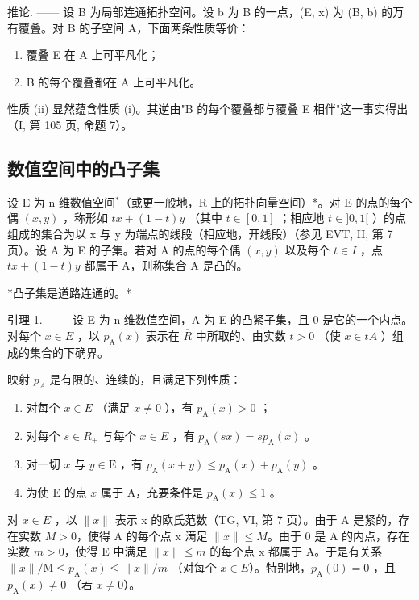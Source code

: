 推论. —— 设 B 为局部连通拓扑空间。设 b 为 B 的一点，(E, x) 为 (B, b) 的万有覆叠。对 B 的子空间 A，下面两条性质等价：

\begin{enumerate}
\def\labelenumi{(\roman{enumi})}
\item
  覆叠 E 在 A 上可平凡化；
\item
  B 的每个覆叠都在 A 上可平凡化。
\end{enumerate}

性质 (ii) 显然蕴含性质 (i)。其逆由"B 的每个覆叠都与覆叠 E 相伴"这一事实得出（I, 第 105 页, 命题 7）。

\subsection{数值空间中的凸子集}

设 E 为 n 维数值空间\(^{*}\)（或更一般地，R 上的拓扑向量空间）*。对 E 的点的每个偶 \((x,y)\) ，称形如 \(tx + (1-t)y\) （其中 \(t \in [0,1]\) ；相应地 \(t \in ]0,1[\) ）的点组成的集合为以 x 与 y 为端点的线段（相应地，开线段）（参见 EVT, II, 第 7 页）。设 A 为 E 的子集。若对 A 的点的每个偶 \((x,y)\) 以及每个 \(t \in I\) ，点 \(tx + (1-t)y\) 都属于 A，则称集合 A 是凸的。

*凸子集是道路连通的。*

引理 1. —— 设 E 为 n 维数值空间，A 为 E 的凸紧子集，且 0 是它的一个内点。对每个 \(x \in E\) ，以 \(p_{\mathrm{A}}(x)\) 表示在 \(\overline{R}\) 中所取的、由实数 \(t > 0\) （使 \(x \in tA\) ）组成的集合的下确界。

映射 \(p_{A}\) 是有限的、连续的，且满足下列性质：

\begin{enumerate}
\def\labelenumi{(\roman{enumi})}
\item
  对每个 \(x \in E\) （满足 \(x \neq 0\) ），有 \(p_{\mathrm{A}}(x) > 0\) ；
\item
  对每个 \(s \in R_{+}\) 与每个 \(x \in E\) ，有 \(p_{\mathrm{A}}(sx) = sp_{\mathrm{A}}(x)\) 。
\item
  对一切 \(x\) 与 \(y \in \mathrm{E}\) ，有 \(p_{\mathrm{A}}(x + y) \leqslant p_{\mathrm{A}}(x) + p_{\mathrm{A}}(y)\) 。
\item
  为使 E 的点 \(x\) 属于 A，充要条件是 \(p_{\mathrm{A}}(x) \leqslant 1\) 。
\end{enumerate}

对 \(x \in E\) ，以 \(\|x\|\) 表示 x 的欧氏范数（TG, VI, 第 7 页）。由于 A 是紧的，存在实数 \(M > 0\)，使得 A 的每个点 x 满足 \(\|x\| \leqslant M\)。由于 0 是 A 的内点，存在实数 \(m > 0\)，使得 E 中满足 \(\|x\| \leqslant m\) 的每个点 x 都属于 A。于是有关系 \(\|x\|/\mathrm{M} \leqslant p_{\mathrm{A}}(x) \leqslant \|x\|/m\) （对每个 \(x \in E\)）。特别地，\(p_{\mathrm{A}}(0) = 0\) ，且 \(p_{\mathrm{A}}(x) \neq 0\) （若 \(x \neq 0\)）。

